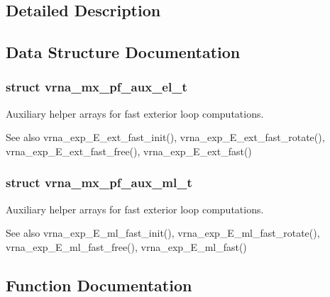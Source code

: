 \subsection{Detailed Description}


\subsection{Data Structure Documentation}
\label{structvrna__mx__pf__aux__el__t}
\hypertarget{group__loops_structvrna__mx__pf__aux__el__t}{}
\subsubsection{struct vrna\+\_\+mx\+\_\+pf\+\_\+aux\+\_\+el\+\_\+t}
Auxiliary helper arrays for fast exterior loop computations. 

\begin{DoxySeeAlso}{See also}
vrna\+\_\+exp\+\_\+\+E\+\_\+ext\+\_\+fast\+\_\+init(), vrna\+\_\+exp\+\_\+\+E\+\_\+ext\+\_\+fast\+\_\+rotate(), vrna\+\_\+exp\+\_\+\+E\+\_\+ext\+\_\+fast\+\_\+free(), vrna\+\_\+exp\+\_\+\+E\+\_\+ext\+\_\+fast() 
\end{DoxySeeAlso}
\label{structvrna__mx__pf__aux__ml__t}
\hypertarget{group__loops_structvrna__mx__pf__aux__ml__t}{}
\subsubsection{struct vrna\+\_\+mx\+\_\+pf\+\_\+aux\+\_\+ml\+\_\+t}
Auxiliary helper arrays for fast exterior loop computations. 

\begin{DoxySeeAlso}{See also}
vrna\+\_\+exp\+\_\+\+E\+\_\+ml\+\_\+fast\+\_\+init(), vrna\+\_\+exp\+\_\+\+E\+\_\+ml\+\_\+fast\+\_\+rotate(), vrna\+\_\+exp\+\_\+\+E\+\_\+ml\+\_\+fast\+\_\+free(), vrna\+\_\+exp\+\_\+\+E\+\_\+ml\+\_\+fast() 
\end{DoxySeeAlso}


\subsection{Function Documentation}
